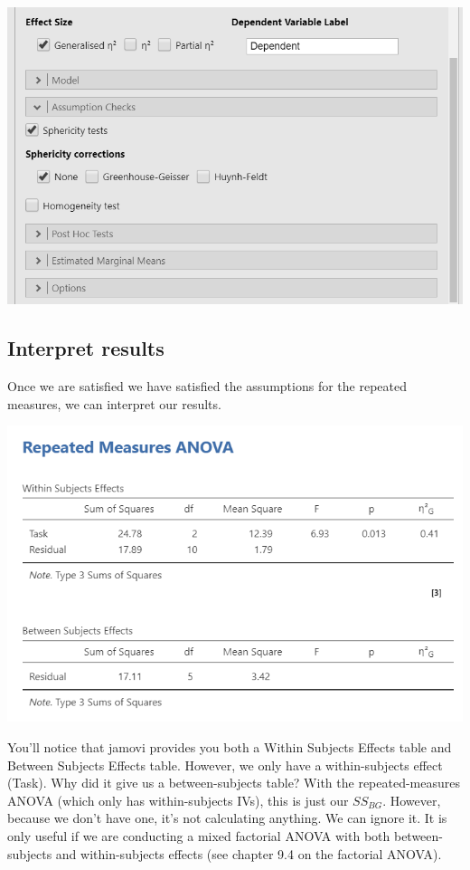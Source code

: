 \documentclass[
]{book}
\begin{document}
\includegraphics{images/05-repeated-measures-anova/rm-anova_setup2.png}

\hypertarget{interpret-results-5}{%
\subsection{Interpret results}\label{interpret-results-5}}

Once we are satisfied we have satisfied the assumptions for the repeated measures, we can interpret our results.

\includegraphics{images/05-repeated-measures-anova/rm-anova_results.png}

You'll notice that jamovi provides you both a Within Subjects Effects table and Between Subjects Effects table. However, we only have a within-subjects effect (Task). Why did it give us a between-subjects table? With the repeated-measures ANOVA (which only has within-subjects IVs), this is just our \(SS_{BG}\). However, because we don't have one, it's not calculating anything. We can ignore it. It is only useful if we are conducting a mixed factorial ANOVA with both between-subjects and within-subjects effects (see chapter 9.4 on the factorial ANOVA).
\end{document}
